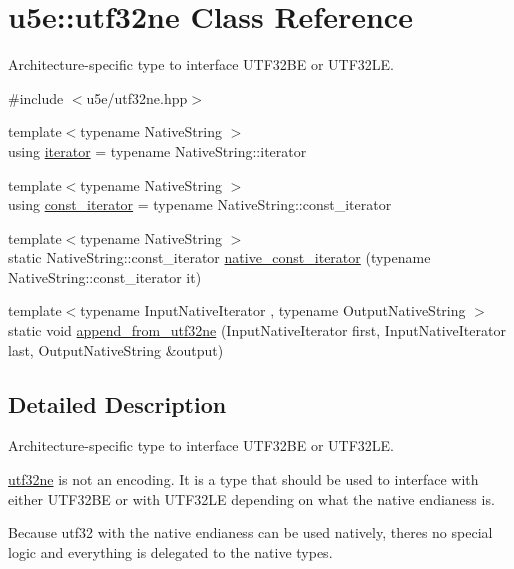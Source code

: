 \hypertarget{classu5e_1_1utf32ne}{}\section{u5e\+:\+:utf32ne Class Reference}
\label{classu5e_1_1utf32ne}


Architecture-\/specific type to interface U\+T\+F32\+BE or U\+T\+F32\+LE.  




{\ttfamily \#include $<$u5e/utf32ne.\+hpp$>$}

\begin{DoxyCompactItemize}
\item 
{\footnotesize template$<$typename Native\+String $>$ }\\using \hyperlink{classu5e_1_1utf32ne_aa94f3484382747653c46ce429612eedc}{iterator} = typename Native\+String\+::iterator
\item 
{\footnotesize template$<$typename Native\+String $>$ }\\using \hyperlink{classu5e_1_1utf32ne_a4d281b04b01e996702b02445fa25fc76}{const\+\_\+iterator} = typename Native\+String\+::const\+\_\+iterator
\item 
{\footnotesize template$<$typename Native\+String $>$ }\\static Native\+String\+::const\+\_\+iterator \hyperlink{classu5e_1_1utf32ne_a9ab16ff63de47e7f02532d03af7b70c1}{native\+\_\+const\+\_\+iterator} (typename Native\+String\+::const\+\_\+iterator it)
\item 
{\footnotesize template$<$typename Input\+Native\+Iterator , typename Output\+Native\+String $>$ }\\static void \hyperlink{classu5e_1_1utf32ne_a6678bc31c37d8b740ea3fd47d572774b}{append\+\_\+from\+\_\+utf32ne} (Input\+Native\+Iterator first, Input\+Native\+Iterator last, Output\+Native\+String \&output)
\end{DoxyCompactItemize}


\subsection{Detailed Description}
Architecture-\/specific type to interface U\+T\+F32\+BE or U\+T\+F32\+LE. 

\hyperlink{classu5e_1_1utf32ne}{utf32ne} is not an encoding. It is a type that should be used to interface with either U\+T\+F32\+BE or with U\+T\+F32\+LE depending on what the native endianess is.

Because utf32 with the native endianess can be used natively, there\textquotesingle{}s no special logic and everything is delegated to the native types. 

